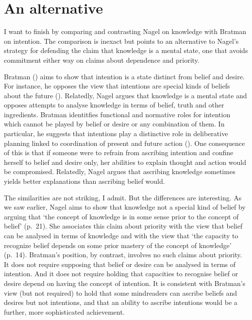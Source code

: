 \documentclass[11pt,a4paper]{extarticle}
\begin{document}
\section{An alternative}
I want to finish by
comparing and contrasting
Nagel on knowledge
with 
Bratman on intention.
The comparison is inexact but points to an alternative to Nagel's strategy for defending the claim that knowledge is a mental state,
one that avoids commitment either way on claims about dependence and priority.


Bratman
(\citeyear{bratman_faces_1999,Bratman:1987xw})
aims to show that intention is a state distinct from  belief and desire.
For instance, he opposes the view that intentions are special kinds of beliefs about the future (\citeyear[pp.\ 257ff]{bratman_faces_1999}).
Relatedly, Nagel argues that knowledge is a mental 
 state and
opposes attempts to analyse knowledge in terms of belief, truth and other ingredients.
Bratman identitfies functional and normative roles for intention which cannot be played by belief or desire or any combination of them.
In particular, he suggests that intentions play a distinctive role in deliberative planning linked to coordination of present and future action
(\citeyear[p.\ 223]{bratman_faces_1999}).
One consequence of this is that if someone were to refrain from ascribing intention and confine herself to belief and desire only, her abilities to explain thought and action would be compromised.
Relatedly, Nagel argues that ascribing knowledge sometimes yields  better explanations than ascribing belief would.

The similarities are not striking, I admit.
But the differences are interesting.
As we saw earlier,
Nagel aims to show that knowledge not a special kind of belief by arguing that `the concept of knowledge is in some sense prior to the concept of belief' (p.\ 21).
She associates this 
claim about priority 
with the view 
that belief can be analysed in terms of knowledge 
and with the view
that `the capacity to recognize belief depends on some prior mastery of the concept of knowledge' (p.\ 14).
Bratman's position, 
by contrast, 
involves no such claims about priority.
It does not require supposing that belief or desire can be analysed in terms of intention.
And it does not require holding that capacities to recognise belief or desire depend on having the concept of intention.
It is consistent with Bratman's view 
(but not required) 
to hold that 
some mindreaders can ascribe beliefs and desires but not intentions,
and that 
an ability to ascribe intentions would be a further, more sophisticated achievement.
\end{document}
